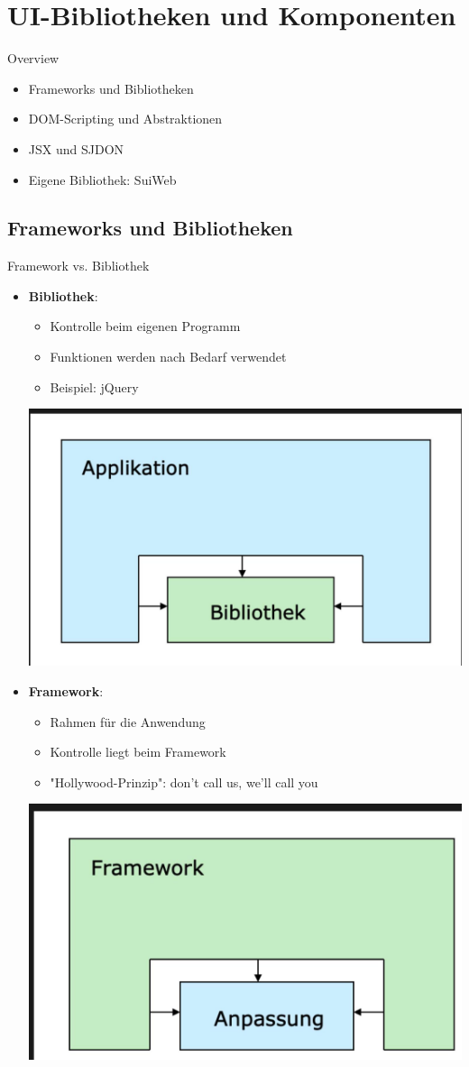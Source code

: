 \section{UI-Bibliotheken und Komponenten}

\begin{definition}{Overview}
\begin{itemize}
  \item Frameworks und Bibliotheken
  \item DOM-Scripting und Abstraktionen
  \item JSX und SJDON
  \item Eigene Bibliothek: SuiWeb
\end{itemize}
\end{definition}

\subsection{Frameworks und Bibliotheken}

\begin{definition}{Framework vs. Bibliothek}
    \begin{itemize}
        \item \textbf{Bibliothek}: 
            \begin{itemize}
                \item Kontrolle beim eigenen Programm
                \item Funktionen werden nach Bedarf verwendet
                \item Beispiel: jQuery
            \end{itemize}
            \includegraphics[width=0.5\linewidth]{images/2025_01_02_22162ee5453ad0230328g-04}
        \item \textbf{Framework}: 
            \begin{itemize}
                \item Rahmen für die Anwendung
                \item Kontrolle liegt beim Framework
                \item "Hollywood-Prinzip": don't call us, we'll call you
            \end{itemize}
            \includegraphics[width=0.5\linewidth]{images/2025_01_02_22162ee5453ad0230328g-05}
    \end{itemize}
\end{definition}

